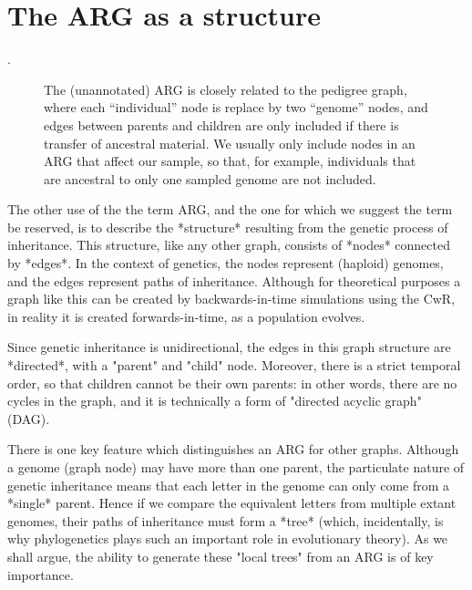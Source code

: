 \documentclass{article}
\begin{document}
\section*{The ARG as a structure}

\citep[e.g.][]{minichiello2006mapping,mathieson2020ancestry}.

\begin{figure}
\vspace{5em}
\caption{\label{fig-pedigree-and-arg}
The (unannotated) ARG is closely related to the pedigree
graph, where each ``individual'' node is replace by two ``genome''
nodes, and edges between parents and children are only included if there is
transfer of ancestral material. We usually only include nodes in an ARG
that affect our sample, so that, for example, individuals that are ancestral
to only one sampled genome are not included.}
\end{figure}



The other use of the the term ARG, and the one for which we suggest the term be
reserved, is to describe the *structure* resulting from the genetic process of
inheritance. This structure, like any other graph, consists of *nodes*
connected by *edges*. In the context of genetics, the nodes represent (haploid)
genomes, and the edges represent paths of inheritance. Although for theoretical
purposes a graph like this can be created by backwards-in-time simulations
using the CwR, in reality it is created forwards-in-time, as a population
evolves.

Since genetic inheritance is unidirectional, the edges in this graph structure
are *directed*, with a "parent" and "child" node. Moreover, there is a strict
temporal order, so that children cannot be their own parents: in other words,
there are no cycles in the graph, and it is technically a form of "directed
acyclic graph" (DAG).


There is one key feature which distinguishes an ARG for other graphs. Although
a genome (graph node) may have more than one parent, the particulate nature of
genetic inheritance means that each letter in the genome can only come from a
*single* parent. Hence if we compare the equivalent letters from multiple
extant genomes, their paths of inheritance must form a *tree* (which,
incidentally, is why phylogenetics plays such an important role in evolutionary
theory). As we shall argue, the ability to generate these "local trees" from an
ARG is of key importance.
\end{document}
